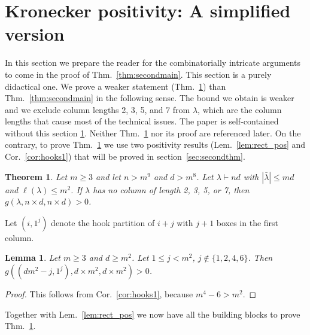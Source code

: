 \documentclass{article}
\numberwithin{equation}{section}
\newtheorem{theorem}[equation]{Theorem}
\newtheorem{lemma}[equation]{Lemma}
\theoremstyle{definition}
\def\la{\lambda}
\begin{document}
\section{Kronecker positivity: A simplified version}\label{sec:didact}
In this section we prepare the reader for the combinatorially intricate arguments to come in the proof of Thm.~\ref{thm:secondmain}.
This section is a purely didactical one. We prove a weaker statement (Thm.~\ref{thm:didact}) than Thm.~\ref{thm:secondmain} in the following sense.
The bound we obtain is weaker and we exclude column lengths 2, 3, 5, and 7 from $\la$, which are the column lengths that cause most of the technical issues.
The paper is self-contained without this section \ref{sec:didact}. Neither Thm.~\ref{thm:didact} nor its proof are referenced later.
On the contrary, to prove Thm.~\ref{thm:didact} we use two positivity results (Lem.~\ref{lem:rect_pos} and Cor.~\ref{cor:hooks1}) that will be proved in section~\ref{sec:secondthm}.
\begin{theorem}\label{thm:didact}
Let $m\geq 3$ and let $n>m^9$ and $d > m^8$.
Let $\la \vdash nd$ with $|\bar\la|\leq md$ and $\ell(\la)\leq m^2$.
If $\la$ has no column of length 2, 3, 5, or 7, then $g(\la,n \times d, n \times d)>0$.
\end{theorem}
Let $(i,1^j)$ denote the hook partition of $i+j$ with $j+1$ boxes in the first column.
\begin{lemma}\label{lem:didacthooks}
Let $m\geq 3$ and $d \geq m^2$.
Let $1 \leq j < m^2$, $j \notin \{1,2,4,6\}$.
Then $g((d m^2-j,1^j),d \times m^2, d \times m^2) > 0$.
\end{lemma}
\begin{proof}
This follows from Cor.~\ref{cor:hooks1}, because $m^4-6 > m^2$.
\end{proof}
Together with Lem.~\ref{lem:rect_pos} we now have all the building blocks to prove Thm.~\ref{thm:didact}.
\end{document}
